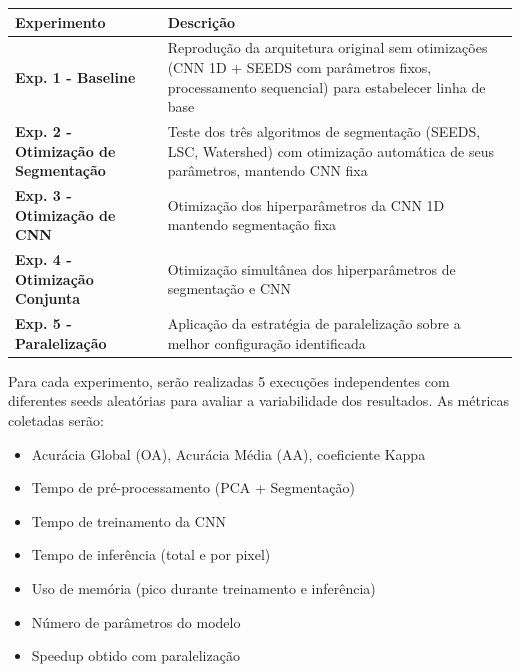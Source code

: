 \begin{quadro}[H]
    \centering
    \caption{Descrição detalhada dos experimentos}
    \begin{tabular}{|p{}|p{}|}
        \hline
        \rowcolor[HTML]{C0C0C0}
        \textbf{Experimento} & \textbf{Descrição} \\
        \hline
        
        \textbf{Exp. 1 - Baseline} & Reprodução da arquitetura original sem otimizações (CNN 1D + SEEDS com parâmetros fixos, processamento sequencial) para estabelecer linha de base \\
        \hline
        
        \textbf{Exp. 2 - Otimização de Segmentação} & Teste dos três algoritmos de segmentação (SEEDS, LSC, Watershed) com otimização automática de seus parâmetros, mantendo CNN fixa \\
        \hline
        
        \textbf{Exp. 3 - Otimização de CNN} & Otimização dos hiperparâmetros da CNN 1D mantendo segmentação fixa \\
        \hline
        
        \textbf{Exp. 4 - Otimização Conjunta} & Otimização simultânea dos hiperparâmetros de segmentação e CNN \\
        \hline
        
        \textbf{Exp. 5 - Paralelização} & Aplicação da estratégia de paralelização sobre a melhor configuração identificada \\
        \hline
    \end{tabular}
    \label{tab:descricaoExperimentos}
\end{quadro}

Para cada experimento, serão realizadas 5 execuções independentes com diferentes seeds aleatórias para avaliar a variabilidade dos resultados. As métricas coletadas serão:

\begin{itemize}
    \item Acurácia Global (OA), Acurácia Média (AA), coeficiente Kappa
    \item Tempo de pré-processamento (PCA + Segmentação)
    \item Tempo de treinamento da CNN
    \item Tempo de inferência (total e por pixel)
    \item Uso de memória (pico durante treinamento e inferência)
    \item Número de parâmetros do modelo
    \item Speedup obtido com paralelização
\end{itemize}

